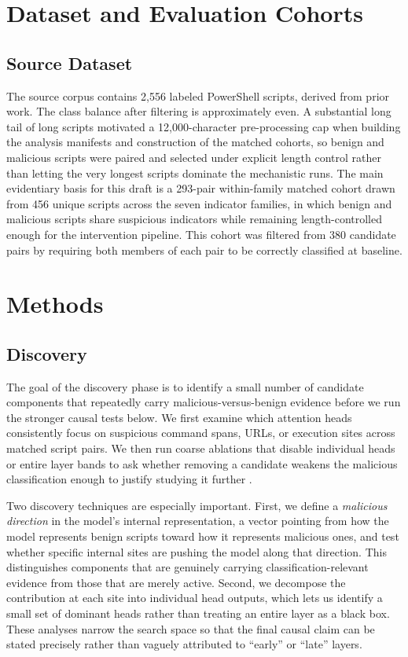 \documentclass{article}
\begin{document}
\section{Dataset and Evaluation Cohorts}
\subsection{Source Dataset}
The source corpus contains 2{,}556 labeled PowerShell scripts, derived from prior work\citep{FANG202130}. The class balance after filtering is approximately even. A substantial long tail of long scripts motivated  a 12,000-character pre-processing cap when building the analysis manifests and construction of the matched cohorts, so benign and malicious scripts were paired and selected under explicit length control rather than letting the very longest scripts dominate the mechanistic runs. The main evidentiary basis for this draft is a 293-pair within-family matched cohort drawn from 456 unique scripts across the seven indicator families, in which benign and malicious scripts share suspicious indicators while remaining length-controlled enough for the intervention pipeline. This cohort was filtered from 380 candidate pairs by requiring both members of each pair to be correctly classified at baseline. 

\section{Methods}
\subsection{Discovery}
The goal of the discovery phase is to identify a small number of candidate components that repeatedly carry malicious-versus-benign evidence before we run the stronger causal tests below. We first examine which attention heads consistently focus on suspicious command spans, URLs, or execution sites across matched script pairs. We then run coarse ablations that disable individual heads or entire layer bands to ask whether removing a candidate weakens the malicious classification enough to justify studying it further \citep{cammarata2020thread,elhage2021mathematical,conmy2023automated,ameisen2025attributiongraphs}.

Two discovery techniques are especially important. First, we define a \emph{malicious direction} in the model's internal representation, a vector pointing from how the model represents benign scripts toward how it represents malicious ones, and test whether specific internal sites are pushing the model along that direction. This distinguishes components that are genuinely carrying classification-relevant evidence from those that are merely active. Second, we decompose the contribution at each site into individual head outputs, which lets us identify a small set of dominant heads rather than treating an entire layer as a black box. These analyses narrow the search space so that the final causal claim can be stated precisely rather than vaguely attributed to ``early'' or ``late'' layers.
\end{document}
